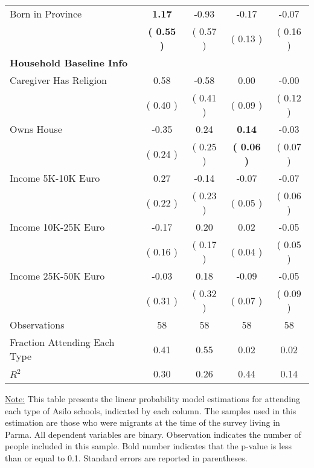 \begin{table}[H]
{\begin{tabular}{lcccc}
\quad Born in Province & \textbf{     1.17} &     -0.93 &     -0.17 &     -0.07 \\
\quad  & \textbf{(     0.55 )} & (     0.57 )  & (     0.13 )  & (     0.16 )  \\
\midrule
\textbf{Household Baseline Info} \\
\quad Caregiver Has Religion &      0.58 &     -0.58 &      0.00 &     -0.00 \\
\quad  & (     0.40 ) & (     0.41 )  & (     0.09 )  & (     0.12 )  \\
\quad Owns House &     -0.35 &      0.24 & \textbf{     0.14} &     -0.03 \\
\quad  & (     0.24 ) & (     0.25 )  & \textbf{(     0.06 )}  & (     0.07 )  \\
\quad Income 5K-10K Euro &      0.27 &     -0.14 &     -0.07 &     -0.07 \\
\quad  & (     0.22 ) & (     0.23 )  & (     0.05 )  & (     0.06 )  \\
\quad Income 10K-25K Euro &     -0.17 &      0.20 &      0.02 &     -0.05 \\
\quad  & (     0.16 ) & (     0.17 )  & (     0.04 )  & (     0.05 )  \\
\quad Income 25K-50K Euro &     -0.03 &      0.18 &     -0.09 &     -0.05 \\
\quad  & (     0.31 ) & (     0.32 )  & (     0.07 )  & (     0.09 )  \\
\midrule
Observations & 58 & 58 & 58 & 58 \\
Fraction Attending Each Type &      0.41 &      0.55 &      0.02 &      0.02 \\
\midrule
$ R^2$ &      0.30 &      0.26 &      0.44 &      0.14 \\
\bottomrule
\end{tabular}}
\end{table}
\begin{scriptsize}
\noindent\underline{Note:} This table presents the linear probability model estimations for attending each type of Asilo schools, indicated by each column. The samples used in this estimation are those who were migrants at the time of the survey living in Parma. All dependent variables are binary. Observation indicates the number of people included in this sample. Bold number indicates that the p-value is less than or equal to 0.1. Standard errors are reported in parentheses.
\end{scriptsize}
